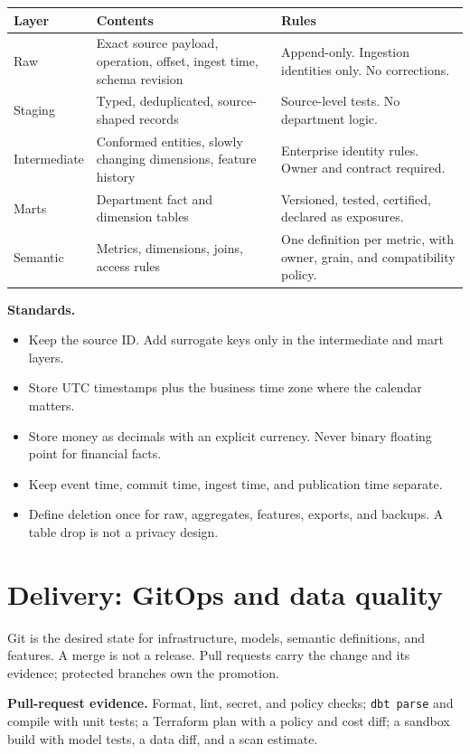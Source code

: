 \documentclass[10pt,a4paper]{article}
\newcommand{\code}[1]{\nolinkurl{#1}}
\begin{document}
{\small
\begin{tabularx}{\textwidth}{L{24mm}L{58mm}Y}
\toprule
\textbf{Layer} & \textbf{Contents} & \textbf{Rules} \\
\midrule
Raw & Exact source payload, operation, offset, ingest time, schema revision & Append-only. Ingestion identities only. No corrections. \\
Staging & Typed, deduplicated, source-shaped records & Source-level tests. No department logic. \\
Intermediate & Conformed entities, slowly changing dimensions, feature history & Enterprise identity rules. Owner and contract required. \\
Marts & Department fact and dimension tables & Versioned, tested, certified, declared as exposures. \\
Semantic & Metrics, dimensions, joins, access rules & One definition per metric, with owner, grain, and compatibility policy. \\
\bottomrule
\end{tabularx}
}

\textbf{Standards.}
\begin{itemize}
  \item Keep the source ID. Add surrogate keys only in the intermediate and mart layers.
  \item Store UTC timestamps plus the business time zone where the calendar matters.
  \item Store money as decimals with an explicit currency. Never binary floating point for financial facts.
  \item Keep event time, commit time, ingest time, and publication time separate.
  \item Define deletion once for raw, aggregates, features, exports, and backups. A table drop is not a privacy design.
\end{itemize}

\section{Delivery: GitOps and data quality}

Git is the desired state for infrastructure, models, semantic
definitions, and features. A merge is not a release. Pull requests carry
the change and its evidence; protected branches own the promotion.

\textbf{Pull-request evidence.} Format, lint, secret, and policy checks;
\code{dbt parse} and compile with unit tests; a Terraform plan with a
policy and cost diff; a sandbox build with model tests, a data diff, and
a scan estimate.
\end{document}
